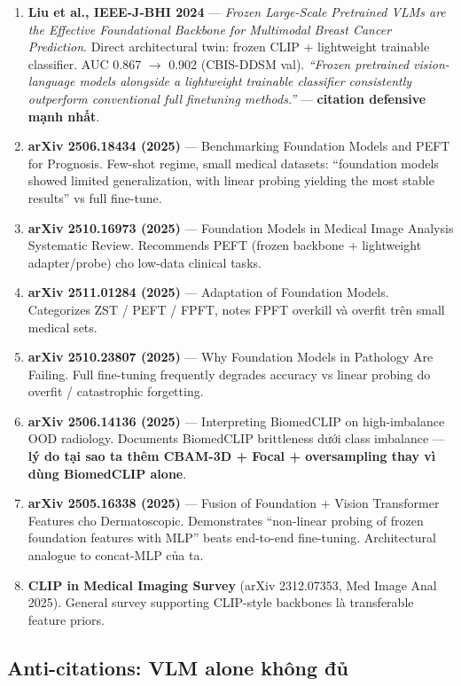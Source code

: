 \documentclass[11pt,a4paper]{article}
\begin{document}
\begin{enumerate}[leftmargin=*]
\item \textbf{Liu et al., IEEE-J-BHI 2024} --- \emph{Frozen Large-Scale
Pretrained VLMs are the Effective Foundational Backbone for Multimodal
Breast Cancer Prediction}. Direct architectural twin: frozen CLIP +
lightweight trainable classifier. AUC 0.867 $\to$ 0.902 (CBIS-DDSM
val). \emph{``Frozen pretrained vision-language models alongside a
lightweight trainable classifier consistently outperform conventional
full finetuning methods.''} --- \textbf{citation defensive mạnh nhất}.
\item \textbf{arXiv 2506.18434 (2025)} --- Benchmarking Foundation
Models and PEFT for Prognosis. Few-shot regime, small medical
datasets: ``foundation models showed limited generalization, with
linear probing yielding the most stable results'' vs full fine-tune.
\item \textbf{arXiv 2510.16973 (2025)} --- Foundation Models in
Medical Image Analysis Systematic Review. Recommends PEFT (frozen
backbone + lightweight adapter/probe) cho low-data clinical tasks.
\item \textbf{arXiv 2511.01284 (2025)} --- Adaptation of Foundation
Models. Categorizes ZST / PEFT / FPFT, notes FPFT overkill và overfit
trên small medical sets.
\item \textbf{arXiv 2510.23807 (2025)} --- Why Foundation Models in
Pathology Are Failing. Full fine-tuning frequently degrades accuracy
vs linear probing do overfit / catastrophic forgetting.
\item \textbf{arXiv 2506.14136 (2025)} --- Interpreting BiomedCLIP on
high-imbalance OOD radiology. Documents BiomedCLIP brittleness dưới
class imbalance --- \textbf{lý do tại sao ta thêm CBAM-3D + Focal +
oversampling thay vì dùng BiomedCLIP alone}.
\item \textbf{arXiv 2505.16338 (2025)} --- Fusion of Foundation +
Vision Transformer Features cho Dermatoscopic. Demonstrates
``non-linear probing of frozen foundation features with MLP'' beats
end-to-end fine-tuning. Architectural analogue to concat-MLP của ta.
\item \textbf{CLIP in Medical Imaging Survey} (arXiv 2312.07353, Med
Image Anal 2025). General survey supporting CLIP-style backbones là
transferable feature priors.
\end{enumerate}

\subsection{Anti-citations: VLM alone không đủ}
\end{document}
